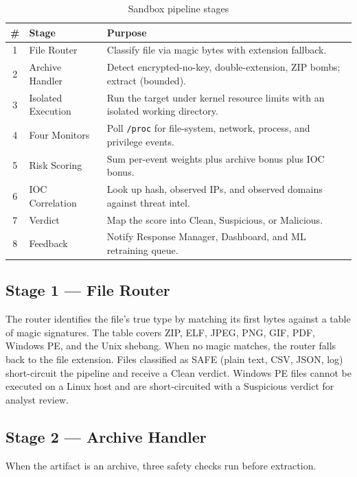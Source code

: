 \documentclass[12pt, a4paper]{report}
\begin{document}
\begin{table}[H]
\centering
\caption{Sandbox pipeline stages}
\label{tab:sb_stages}
\begin{tabular}{|c|l|p{8.2cm}|}
\hline
\textbf{\#} & \textbf{Stage} & \textbf{Purpose} \\
\hline
1 & File Router & Classify file via magic bytes with extension fallback. \\
\hline
2 & Archive Handler & Detect encrypted-no-key, double-extension, ZIP bombs; extract (bounded). \\
\hline
3 & Isolated Execution & Run the target under kernel resource limits with an isolated working directory. \\
\hline
4 & Four Monitors & Poll \texttt{/proc} for file-system, network, process, and privilege events. \\
\hline
5 & Risk Scoring & Sum per-event weights plus archive bonus plus IOC bonus. \\
\hline
6 & IOC Correlation & Look up hash, observed IPs, and observed domains against threat intel. \\
\hline
7 & Verdict & Map the score into Clean, Suspicious, or Malicious. \\
\hline
8 & Feedback & Notify Response Manager, Dashboard, and ML retraining queue. \\
\hline
\end{tabular}
\end{table}

\subsection{Stage 1 --- File Router}

The router identifies the file's true type by matching its first bytes
against a table of magic signatures. The table covers ZIP, ELF,
JPEG, PNG, GIF, PDF, Windows PE, and the Unix shebang. When no magic
matches, the router falls back to the file extension. Files classified
as SAFE (plain text, CSV, JSON, log) short-circuit the pipeline and
receive a Clean verdict. Windows PE files cannot be executed on a
Linux host and are short-circuited with a Suspicious verdict for
analyst review.

\subsection{Stage 2 --- Archive Handler}

When the artifact is an archive, three safety checks run before
extraction.
\end{document}
